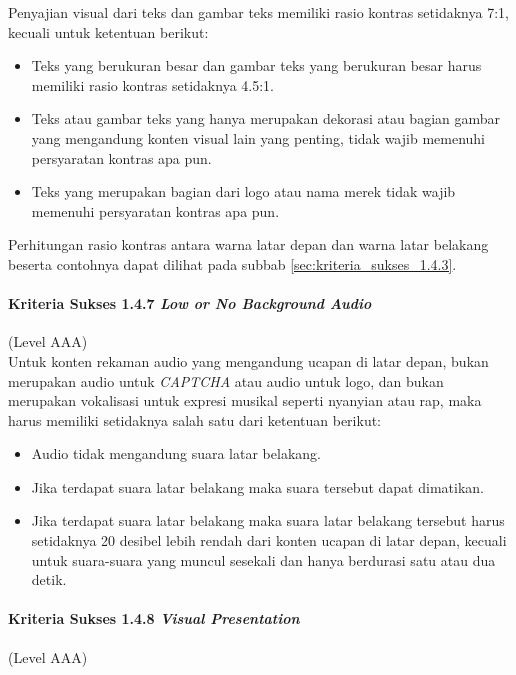 Penyajian visual dari teks dan gambar teks memiliki rasio kontras setidaknya 7:1, kecuali untuk ketentuan berikut:

\begin{itemize}
	\item Teks yang berukuran besar dan gambar teks yang berukuran besar harus memiliki rasio kontras setidaknya 4.5:1.
	\item Teks atau gambar teks yang hanya merupakan dekorasi atau bagian gambar yang mengandung konten visual lain yang penting, tidak wajib memenuhi persyaratan kontras apa pun.
	\item Teks yang merupakan bagian dari logo atau nama merek tidak wajib memenuhi persyaratan kontras apa pun.
\end{itemize}

Perhitungan rasio kontras antara warna latar depan dan warna latar belakang beserta contohnya dapat dilihat pada subbab \ref{sec:kriteria_sukses_1.4.3}.

\paragraph{Kriteria Sukses 1.4.7 \textit{Low or No Background Audio}}
\label{sec:kriteria_sukses_1.4.7}
(Level AAA)\\

Untuk konten rekaman audio yang mengandung ucapan di latar depan, bukan merupakan audio untuk \textit{CAPTCHA} atau audio untuk logo, dan bukan merupakan vokalisasi untuk expresi musikal seperti nyanyian atau rap, maka harus memiliki setidaknya salah satu dari ketentuan berikut:

\begin{itemize}
	\item Audio tidak mengandung suara latar belakang.
	\item Jika terdapat suara latar belakang maka suara tersebut dapat dimatikan.
	\item Jika terdapat suara latar belakang maka suara latar belakang tersebut harus setidaknya 20 desibel lebih rendah dari konten ucapan di latar depan, kecuali untuk suara-suara yang muncul sesekali dan hanya berdurasi satu atau dua detik.
\end{itemize}

\paragraph{Kriteria Sukses 1.4.8 \textit{Visual Presentation}}
\label{sec:kriteria_sukses_1.4.8}
(Level AAA)\\

